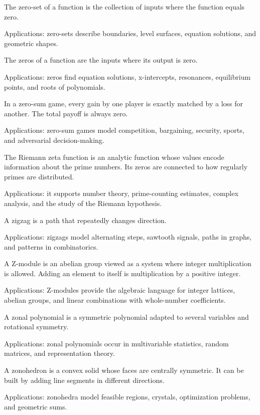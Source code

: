 The zero-set of a function is the collection of inputs where the function equals zero. \par\noindent Applications: zero-sets describe boundaries, level surfaces, equation solutions, and geometric shapes.

The zeros of a function are the inputs where its output is zero. \par\noindent Applications: zeros find equation solutions, x-intercepts, resonances, equilibrium points, and roots of polynomials.

In a zero-sum game, every gain by one player is exactly matched by a loss for another. The total payoff is always zero. \par\noindent Applications: zero-sum games model competition, bargaining, security, sports, and adversarial decision-making.

The Riemann zeta function is an analytic function whose values encode information about the prime numbers. Its zeros are connected to how regularly primes are distributed. \par\noindent Applications: it supports number theory, prime-counting estimates, complex analysis, and the study of the Riemann hypothesis.

A zigzag is a path that repeatedly changes direction. \par\noindent Applications: zigzags model alternating steps, sawtooth signals, paths in graphs, and patterns in combinatorics.

A Z-module is an abelian group viewed as a system where integer multiplication is allowed. Adding an element to itself is multiplication by a positive integer. \par\noindent Applications: Z-modules provide the algebraic language for integer lattices, abelian groups, and linear combinations with whole-number coefficients.

A zonal polynomial is a symmetric polynomial adapted to several variables and rotational symmetry. \par\noindent Applications: zonal polynomials occur in multivariable statistics, random matrices, and representation theory.

A zonohedron is a convex solid whose faces are centrally symmetric. It can be built by adding line segments in different directions. \par\noindent Applications: zonohedra model feasible regions, crystals, optimization problems, and geometric sums.


